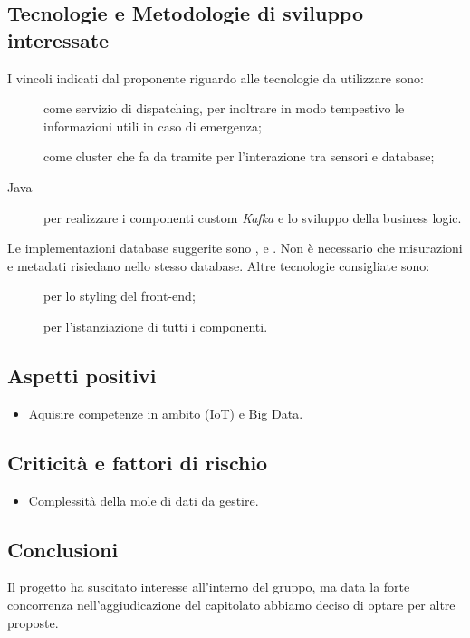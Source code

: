\documentclass[../studio-di-fattibilita.tex]{subfiles}
\begin{document}
  \subsection{Tecnologie e Metodologie di sviluppo interessate}%
  \label{subsec:tecnologie_interessate}
  I vincoli indicati dal proponente riguardo alle tecnologie da utilizzare sono:
  \begin{description}
    \item[] come servizio di dispatching, per inoltrare in modo tempestivo le informazioni utili in caso di emergenza;
    \item[] come cluster che fa da tramite per l'interazione tra sensori e database;
    \item[Java] per realizzare i componenti custom \textit{Kafka} e lo sviluppo della business logic.
  \end{description}
  Le implementazioni database suggerite sono ,  e .
  Non è necessario che misurazioni e metadati risiedano nello stesso database.
  Altre tecnologie consigliate sono:
  \begin{description}
    \item[] per lo styling del front-end;
    \item[] per l'istanziazione di tutti i componenti.
  \end{description}


  \subsection{Aspetti positivi}%
  \label{subsec:aspetti_positivi}
  \begin{itemize}
    \item Aquisire competenze in ambito (IoT) e Big Data.
  \end{itemize}


  \subsection{Criticità e fattori di rischio}%
  \label{subsec:criticita_e_fattori_di_rischio}
  \begin{itemize}
    \item Complessità della mole di dati da gestire.
  \end{itemize}


  \subsection{Conclusioni}%
  \label{subsec:conclusioni}
  Il progetto ha suscitato interesse all'interno del gruppo, ma data la forte concorrenza nell'aggiudicazione del capitolato abbiamo deciso di optare per altre proposte.
\end{document}
